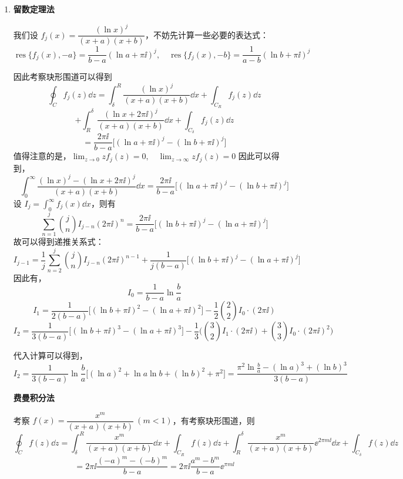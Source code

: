 \begin{question}
\begin{solution}
\begin{enumerate}
注意到有，\(\psi(x)=-\gamma +\displaystyle\int_0^1 \frac{1-t^{x-1}}{1-t}\dd{t}\)，则有 \[ \int_0^1 \frac{t^{p-1}-t^{q-1}}{1-t}\dd{t}=\psi(q)-\psi(p) \]
因此有，\[ \int_0^\infty \frac{x^{\alpha-1}}{1-x^2}\dd{x}=\frac12\bigl(\psi(-\alpha/2+1)-\psi(\alpha/2)\bigr)=\frac{\pi}{2}\cot\frac{\pi\alpha}{2} \]

最后可以得到，\[ \int_0^\infty \frac{x^{\alpha-1} \ln x}{1-x^2}\dd{x} = \pdv{}{\alpha} \biggl(\int_0^\infty \frac{x^{\alpha-1}}{1-x^2}\dd{x}\biggr)=-\frac{\pi^2}{4\sin^2(\pi\alpha/2)} \]

  \item
\textbf{留数定理法}\par

我们设 \(f_j (x)= \dfrac{(\ln x)^j}{(x+a)(x+b)}\)，不妨先计算一些必要的表达式：\[ \operatorname{res}\{f_j (x),-a\}=\frac{1}{b-a} (\ln a+\pi\ii)^j,\quad \operatorname{res}\{f_j (x),-b\}=\frac{1}{a-b} (\ln b + \pi\ii)^j \]

因此考察玦形围道可以得到 \[ \oint_C f_j (z)\dd{z} = \int_\delta^R \frac{(\ln x)^j}{(x+a)(x+b)}\dd{x}+ \int_{C_R} f_j (z)\dd{z} \] \[ +\int_R^\delta \frac{(\ln x + 2\pi\ii)^j}{(x+a)(x+b)}\dd{x}+\int_{C_\delta} f_j (z)\dd{z} \] \[ =\frac{2\pi\ii}{b-a} \bigl[(\ln a + \pi\ii)^j-(\ln b + \pi\ii)^j\bigr] \]
值得注意的是，\(\displaystyle\lim_{z\to0} z f_j (z)=0,\quad \lim_{z\to\infty} z f_j (z)=0\)
因此可以得到，\[ \int_0^\infty \frac{(\ln x)^j-(\ln x+2\pi\ii)^j}{(x+a)(x+b)}\dd{x}= \frac{2\pi\ii}{b-a}\bigl[(\ln a+\pi\ii)^j - (\ln b + \pi\ii)^j\bigr] \]
设 \(I_j=\displaystyle\int_0^\infty f_j (x)\dd{x}\)，则有 \[ \sum_{n=1}^j \binom{j}{n} I_{j-n} (2\pi\ii)^n = \frac{2\pi\ii}{b-a}\bigl[(\ln b + \pi\ii)^j - (\ln a + \pi\ii)^j\bigr] \]
故可以得到递推关系式：
\[ I_{j-1} = \frac1j \sum_{n=2}^j \binom{j}{n} I_{j-n} (2\pi\ii)^{n-1} + \frac1{j(b-a)}\bigl[(\ln b+\pi\ii)^j - (\ln a+\pi\ii)^j\bigr] \]
因此有，\[ I_0 = \frac{1}{b-a} \ln\frac{b}{a} \] \[ I_1 =\frac{1}{2(b-a)}\bigl[(\ln b + \pi\ii)^2-(\ln a+\pi\ii)^2\bigr] -\frac12\binom{2}{2}I_0\cdot (2\pi\ii) \] \[ I_2 = \frac{1}{3(b-a)} \bigl[(\ln b + \pi\ii)^3-(\ln a + \pi\ii)^3\bigr] - \frac13 \bigl(\binom{3}{2} I_1\cdot (2\pi\ii) + \binom{3}{3} I_0\cdot (2\pi\ii)^2\bigr) \]

代入计算可以得到，
\[ I_2=\frac{1}{3(b-a)} \ln\frac{b}{a} \bigl[(\ln a)^2+\ln a\ln b + (\ln b)^2 +\pi^2\bigr]=\frac{\pi^2 \ln\frac{b}{a}-(\ln a)^3+(\ln b)^3}{3(b-a)} \]

\textbf{费曼积分法}\par

考察 \(f(x)= \dfrac{x^m}{(x+a)(x+b)}\ (m<1)\)，有考察玦形围道，则 \[ \oint_C f(z)\dd{z}=\int_\delta^R \frac{x^m}{(x+a)(x+b)}\dd{x}+\int_{C_R} f(z)\dd{z} + \int_R^\delta \frac{x^m}{(x+a)(x+b)} \ee^{2\pi m\ii}\dd{x}+\int_{C_\delta} f(z)\dd{z} \] \[ =2\pi\ii \frac{(-a)^m-(-b)^m}{b-a} = 2\pi\ii \frac{a^m - b^m}{b-a} \ee^{\pi m\ii} \]


\end{enumerate}
\end{solution}
\end{question}
